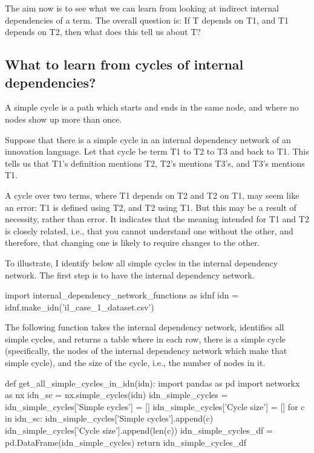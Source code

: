 The aim now is to see what we can learn from looking at indirect internal dependencies of a term. The overall question is: If T depends on T1, and T1 depends on T2, then what does this tell us about T?

\subsection{What to learn from cycles of internal dependencies?}
\label{c7:s5:ss1}
A simple cycle is a path which starts and ends in the same node, and where no nodes show up more than once.

Suppose that there is a simple cycle in an internal dependency network of an innovation language. Let that cycle be term T1 to T2 to T3 and back to T1. This tells us that T1's definition mentions T2, T2's mentions T3's, and T3's mentions T1.

A cycle over two terms, where T1 depends on T2 and T2 on T1, may seem like an error: T1 is defined using T2, and T2 using T1. But this may be a result of necessity, rather than error. It indicates that the meaning intended for T1 and T2 is closely related, i.e., that you cannot understand one without the other, and therefore, that changing one is likely to require changes to the other.

To illustrate, I identify below all simple cycles in the internal dependency network. The first step is to have the internal dependency network.

\begin{pycode}
import internal_dependency_network_functions as idnf
idn = idnf.make_idn('il_case_1_dataset.csv')
\end{pycode}

The following function takes the internal dependency network, identifies all simple cycles, and returns a table where in each row, there is a simple cycle (specifically, the nodes of the internal dependency network which make that simple cycle), and the size of the cycle, i.e., the number of nodes in it.

\begin{pycode}
def get_all_simple_cycles_in_idn(idn):
    import pandas as pd
    import networkx as nx
    idn_sc = nx.simple_cycles(idn)
    idn_simple_cycles = {}
    idn_simple_cycles['Simple cycles'] = []
    idn_simple_cycles['Cycle size'] = []
    for c in idn_sc:
        idn_simple_cycles['Simple cycles'].append(c)
        idn_simple_cycles['Cycle size'].append(len(c))
    idn_simple_cycles_df = pd.DataFrame(idn_simple_cycles)
    return idn_simple_cycles_df
\end{pycode}

